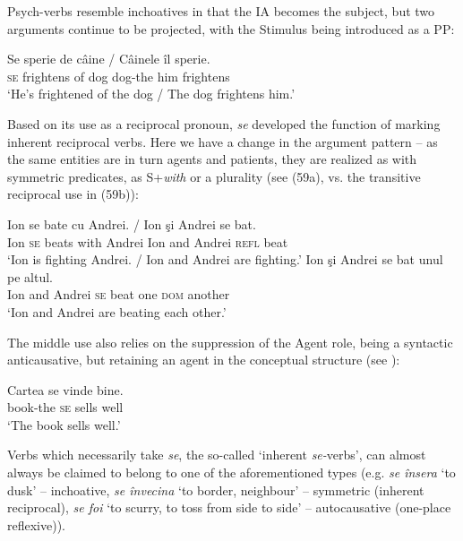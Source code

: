 \documentclass[output=paper]{langsci/langscibook}
\begin{document}
Psych-verbs resemble inchoatives in that the IA becomes the subject, but two arguments continue to be projected, with the Stimulus being introduced as a PP:

\ea%
    \label{ex:giurgea:58}
    \gll Se sperie     de câine / Câinele îl    sperie.\\
         \textsc{se} frightens of dog     dog-the him frightens\\
    \glt ‘He’s frightened of the dog / The dog frightens him.’
    \z



Based on its use as a reciprocal pronoun, \textit{se} developed the function of marking inherent reciprocal verbs. Here we have a change in the argument pattern – as the same entities are in turn agents and patients, they are realized as with symmetric predicates, as S+\textit{with} or a plurality (see (59a), vs. the transitive reciprocal use in (59b)):

\ea%
    \label{ex:giurgea:59}
    \ea
    \gll Ion se  bate   cu   Andrei.   /   Ion şi     Andrei se     bat.\\
          Ion \textsc{se} beats with Andrei        Ion and Andrei \textsc{refl} beat\\
    \glt ‘Ion is fighting Andrei. / Ion and Andrei are fighting.’
    \ex
    \gll Ion şi     Andrei se bat   unul pe     altul.\\
          Ion and Andrei  \textsc{se} beat one  \textsc{dom} another\\
    \glt ‘Ion and Andrei are beating each other.’
    \z
\z

The middle use also relies on the suppression of the Agent role, being a syntactic anticausative, but retaining an agent in the conceptual structure (see \citealt{Schäfer2008}):

\ea%
    \label{ex:giurgea:60}
    \gll Cartea    se vinde bine. \\
         book-the \textsc{se} sells  well\\
    \glt ‘The book sells well.’
    \z

Verbs which necessarily take \textit{se}, the so-called ‘inherent \textit{se-}verbs’, can almost always be claimed to belong to one of the aforementioned types (e.g. \textit{se însera} ‘to dusk’ – inchoative, \textit{se învecina} ‘to border, neighbour’ – symmetric (inherent reciprocal), \textit{se foi} ‘to scurry, to toss from side to side’ – autocausative (one-place reflexive)).
\end{document}
